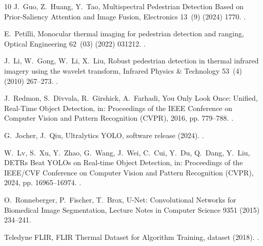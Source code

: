 \begin{thebibliography}{10}
J.~Guo, Z.~Huang, Y.~Tao, {Multispectral Pedestrian Detection Based on
  Prior-Saliency Attention and Image Fusion}, Electronics 13~(9) (2024) 1770.
\newblock \href {https://doi.org/10.3390/electronics13091770}
  {}.

E.~Petilli, {Monocular thermal imaging for pedestrian detection and ranging},
  Optical Engineering 62~(03) (2022) 031212.
\newblock \href {https://doi.org/10.1117/1.OE.62.3.031212}
  {}.

J.~Li, W.~Gong, W.~Li, X.~Liu, {Robust pedestrian detection in thermal infrared
  imagery using the wavelet transform}, Infrared Physics \& Technology 53~(4)
  (2010) 267--273.
\newblock \href {https://doi.org/10.1016/j.infrared.2010.03.005}
  {}.

J.~Redmon, S.~Divvala, R.~Girshick, A.~Farhadi, {You Only Look Once: Unified,
  Real-Time Object Detection}, in: Proceedings of the IEEE Conference on
  Computer Vision and Pattern Recognition (CVPR), 2016, pp. 779--788.
\newblock \href {https://doi.org/10.1109/CVPR.2016.91}
  {}.

G.~Jocher, J.~Qiu, {Ultralytics YOLO}, software release (2024).
\newblock \href {https://github.com/ultralytics/ultralytics}
  {}.

W.~Lv, S.~Xu, Y.~Zhao, G.~Wang, J.~Wei, C.~Cui, Y.~Du, Q.~Dang, Y.~Liu,
  {DETRs Beat YOLOs on Real-time Object Detection}, in: Proceedings of the
  IEEE/CVF Conference on Computer Vision and Pattern Recognition (CVPR), 2024,
  pp. 16965--16974.
\newblock \href {https://doi.org/10.1109/CVPR52733.2024.01605}
  {}.

O.~Ronneberger, P.~Fischer, T.~Brox, {U-Net: Convolutional Networks for
  Biomedical Image Segmentation}, Lecture Notes in Computer Science 9351 (2015)
  234--241\newblock \href {https://doi.org/10.1007/978-3-319-24574-4_28}
  {}.

Teledyne FLIR, {FLIR Thermal Dataset for Algorithm Training}, dataset (2018).
\newblock \href {https://www.flir.com/oem/adas/adas-dataset-form/}
  {}.

\end{thebibliography}
